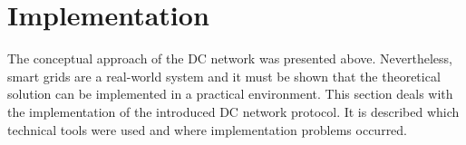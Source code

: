 

\section{Implementation}
\label{sec:implementation}




The conceptual approach of the DC network was presented above. Nevertheless, smart grids are a real-world system and it must be shown that the theoretical solution can be implemented in a practical environment. This section deals with the implementation of the introduced DC network protocol. It is described which technical tools were used and where implementation problems occurred.
